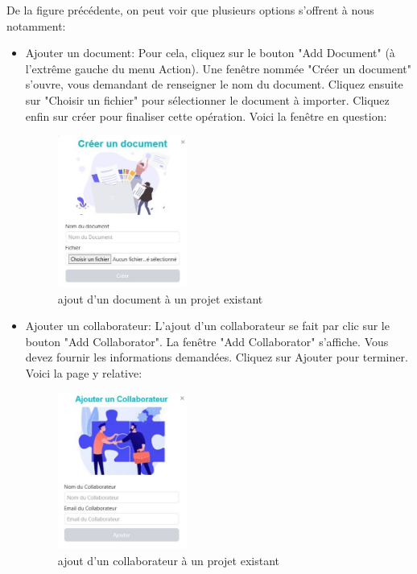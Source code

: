 \documentclass[12pt]{article}
\begin{document}
\medskip
De la figure précédente, on peut voir que plusieurs options s'offrent à nous notamment:
\begin{itemize}
    \item Ajouter un document: Pour cela, cliquez sur le bouton "Add Document" (à l'extrême gauche du menu Action). Une fenêtre nommée "Créer un document" s'ouvre, vous demandant de renseigner le nom du document. Cliquez ensuite sur "Choisir un fichier" pour sélectionner le document à importer. Cliquez enfin sur créer pour finaliser cette opération. Voici la fenêtre en question:
        \begin{figure}[h!]
            \centering
            \includegraphics[width=0.4\textwidth]{./images/create-document.jpg}
            \caption{ajout d'un document à un projet existant}
            \label{fig:ajout d'un document pour un projet}
        \end{figure}
        
        \smallskip
        
    \item Ajouter un collaborateur: L'ajout d'un collaborateur se fait par clic sur le bouton "Add Collaborator". La fenêtre "Add Collaborator" s'affiche. Vous devez fournir les informations demandées. Cliquez sur Ajouter pour terminer. Voici la page y relative:
        \begin{figure}[h!]
            \centering
            \includegraphics[width=0.4\textwidth]{./images/add-collaborator.jpg}
            \caption{ajout d'un collaborateur à un projet existant}
            \label{fig:ajout d'un collaborateur à un projet existant}
        \end{figure}
        

\end{itemize}
\end{document}
